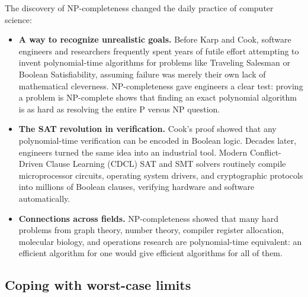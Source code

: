 The discovery of NP-completeness changed the daily practice of computer science:
\begin{itemize}
  \item \textbf{A way to recognize unrealistic goals.} Before Karp and
        Cook, software engineers and researchers frequently spent years of
        futile effort attempting to invent polynomial-time algorithms for
        problems like Traveling Salesman or Boolean Satisfiability, assuming
        failure was merely their own lack of mathematical cleverness.
        NP-completeness gave engineers a clear test: proving a
        problem is NP-complete shows that finding an exact polynomial
        algorithm is as hard as resolving the entire $\mathrm{P}$ versus
        $\mathrm{NP}$ question.
  \item \textbf{The SAT revolution in verification.} Cook's proof showed that
        any polynomial-time verification can be encoded in Boolean logic. Decades
        later, engineers turned the same idea into an industrial tool.
        Modern Conflict-Driven Clause Learning (CDCL) SAT and SMT solvers
        routinely compile microprocessor circuits, operating system drivers, and
        cryptographic protocols into millions of Boolean clauses, verifying
        hardware and software automatically.
  \item \textbf{Connections across fields.} NP-completeness showed that many
        hard problems from graph theory, number theory, compiler register
        allocation, molecular biology, and operations research are
        polynomial-time equivalent: an efficient algorithm for one would give
        efficient algorithms for all of them.
\end{itemize}

\subsection{Coping with worst-case limits}

